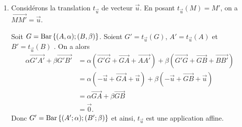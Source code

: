             \begin{ex}
                  \begin{enumerate}
                        \item Consid\'erons la translation $t_{\vec{u}}$ de vecteur $\vec{u}$.
                              En posant $t_{\vec{u}} (M) = M'$, on a $\overrightarrow{MM'} = \vec{u}$.
                              
                              Soit $G = \mathrm{Bar}\left\lbrace (A,\alpha) ; (B,\beta) \right\rbrace$.
                              Soient
                              $G' = t_{\vec{u}} (G)$,
                              $A' = t_{\vec{u}} (A)$ et
                              $B' = t_{\vec{u}} (B)$
                              .
                              On a alors
                              \begin{align*}
                              \alpha \overrightarrow{G'A'} + \beta \overrightarrow{G'B'}
                                    & =  \alpha (\overrightarrow{G'G} + \overrightarrow{GA} + \overrightarrow{AA'})
                                        +\beta (\overrightarrow{G'G} + \overrightarrow{GB} + \overrightarrow{BB'})      \\
                                    & =  \alpha (-\vec{u} + \overrightarrow{GA} + \vec{u})
                                        +\beta (-\vec{u} + \overrightarrow{GB} + \vec{u})      \\
                                    & = \alpha \overrightarrow{GA} + \beta \overrightarrow{GB}      \\
                                    & = \vec{0}.
                              \end{align*}
                              Donc $G' = \mathrm{Bar}\left\lbrace (A';\alpha);(B';\beta) \right\rbrace$ et ainsi, $t_{\vec{u}}$ est une application affine.
                  \end{enumerate}
            \end{ex}
